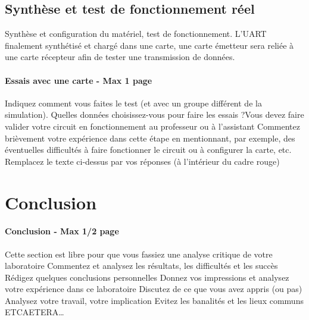 \documentclass[a4paper]{article} %
\begin{document}
 \subsection{Synthèse et test de fonctionnement réel}
Synthèse et configuration du matériel, test de fonctionnement.
L’UART finalement synthétisé et chargé dans une carte, une carte émetteur sera reliée à une carte récepteur afin de tester une transmission de données.
\begin{tcolorbox}[colframe=Monokaimagenta,colback=white, breakable, enhanced]
\paragraph{Essais avec une carte - Max 1 page}
Indiquez comment vous faites le test (et avec un groupe différent de la simulation). Quelles données choisissez-vous pour faire les essais ?Vous devez faire valider votre circuit en fonctionnement au professeur ou à l’assistant
Commentez brièvement votre expérience dans cette étape en mentionnant, par exemple, des éventuelles difficultés à faire fonctionner le circuit ou à configurer la carte, etc.
Remplacez le texte ci-dessus par vos réponses (à l’intérieur du cadre rouge)
\\
\end{tcolorbox}
\section {Conclusion}
\begin{tcolorbox}[colframe=Monokaimagenta,colback=white, breakable, enhanced]
\paragraph{Conclusion - Max 1/2 page}
Cette section est libre pour que vous fassiez une analyse critique de votre laboratoire
Commentez et analysez 
les résultats, 
les difficultés et les succès
Rédigez quelques conclusions personnelles
Donnez vos impressions et analysez votre expérience dans ce laboratoire
Discutez de ce que vous avez appris (ou pas)
Analysez votre travail, votre implication
Evitez les banalités et les lieux communs
ETCAETERA…
\\
\end{tcolorbox}
\end{document}
